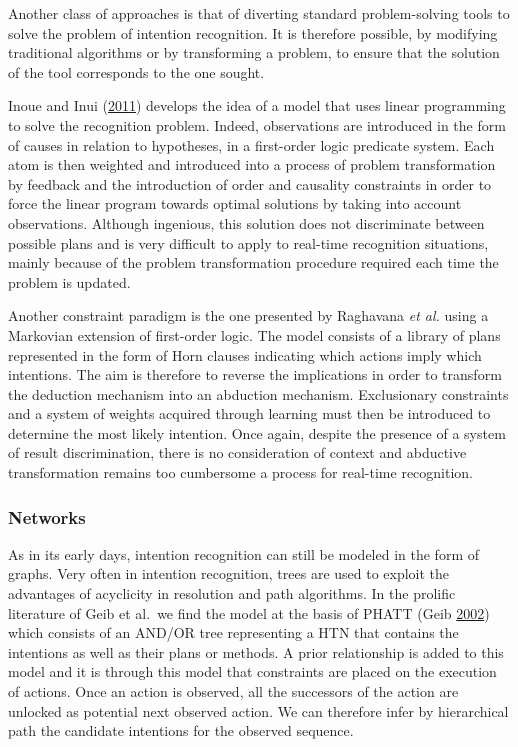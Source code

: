 \documentclass[11pt,a4paper,twoside,openright,titlepage,numbers=noenddot,headinclude,cleardoublepage=empty,openany]{scrreprt}
\theoremstyle{plain}
\theoremstyle{definition}
\theoremstyle{remark}
\begin{document}
Another class of approaches is that of diverting standard
problem-solving tools to solve the problem of intention recognition. It
is therefore possible, by modifying traditional algorithms or by
transforming a problem, to ensure that the solution of the tool
corresponds to the one sought.

Inoue and Inui (\protect\hyperlink{ref-inoue_ilpbased_2011}{2011})
develops the idea of a model that uses linear programming to solve the
recognition problem. Indeed, observations are introduced in the form of
causes in relation to hypotheses, in a first-order logic predicate
system. Each atom is then weighted and introduced into a process of
problem transformation by feedback and the introduction of order and
causality constraints in order to force the linear program towards
optimal solutions by taking into account observations. Although
ingenious, this solution does not discriminate between possible plans
and is very difficult to apply to real-time recognition situations,
mainly because of the problem transformation procedure required each
time the problem is updated.

Another constraint paradigm is the one presented by Raghavana \emph{et
al.} using a Markovian extension of first-order logic. The model
consists of a library of plans represented in the form of Horn clauses
indicating which actions imply which intentions. The aim is therefore to
reverse the implications in order to transform the deduction mechanism
into an abduction mechanism. Exclusionary constraints and a system of
weights acquired through learning must then be introduced to determine
the most likely intention. Once again, despite the presence of a system
of result discrimination, there is no consideration of context and
abductive transformation remains too cumbersome a process for real-time
recognition.

\hypertarget{networks}{%
\subsubsection{Networks}\label{networks}}

As in its early days, intention recognition can still be modeled in the
form of graphs. Very often in intention recognition, trees are used to
exploit the advantages of acyclicity in resolution and path algorithms.
In the prolific literature of Geib et al.~we find the model at the basis
of PHATT (Geib \protect\hyperlink{ref-geib_problems_2002}{2002}) which
consists of an AND/OR tree representing a HTN that contains the
intentions as well as their plans or methods. A prior relationship is
added to this model and it is through this model that constraints are
placed on the execution of actions. Once an action is observed, all the
successors of the action are unlocked as potential next observed action.
We can therefore infer by hierarchical path the candidate intentions for
the observed sequence.
\end{document}
